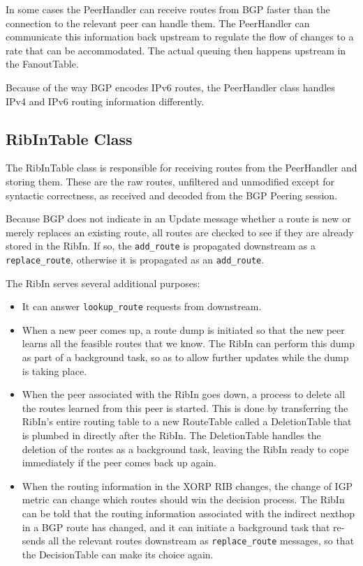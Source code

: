 \documentclass[11pt]{article}
\begin{document}
In some cases the PeerHandler can receive routes from BGP faster than
the connection to the relevant peer can handle them.  The PeerHandler
can communicate this information back upstream to regulate the flow of
changes to a rate that can be accommodated.  The actual queuing then
happens upstream in the FanoutTable.

Because of the way BGP encodes IPv6 routes, the PeerHandler class
handles IPv4 and IPv6 routing information differently.

\subsection{RibInTable Class}

The RibInTable class is responsible for receiving routes from the
PeerHandler and storing them.  These are the raw routes, unfiltered
and unmodified except for syntactic correctness, as received and
decoded from the BGP Peering session.

Because BGP does not indicate in an Update message whether a route is
new or merely replaces an existing route, all routes are checked to
see if they are already stored in the RibIn.  If so, the {\tt add\_route} is
propagated downstream as a {\tt replace\_route}, otherwise it is propagated
as an {\tt add\_route}.

The RibIn serves several additional purposes:
\begin{itemize}
\item It can answer {\tt lookup\_route} requests from downstream.
\item When a new peer comes up, a route dump is initiated so that the
new peer learns all the feasible routes that we know.  The RibIn can
perform this dump as part of a background task, so as to allow further
updates while the dump is taking place.
\item When the peer associated with the RibIn goes down, a process to
delete all the routes learned from this peer is started.  This is done
by transferring the RibIn's entire routing table to a new RouteTable
called a DeletionTable that is plumbed in directly after the RibIn.
The DeletionTable handles the deletion of the routes as a background
task, leaving the RibIn ready to cope immediately if the peer comes
back up again.
\item When the routing information in the XORP RIB changes, the change
of IGP metric can change which routes should win the decision process.
The RibIn can be told that the routing information associated with the
indirect nexthop in a BGP route has changed, and it can initiate a
background task that re-sends all the relevant routes downstream as
{\tt replace\_route} messages, so that the DecisionTable can make its choice
again.
\end{itemize}
\end{document}
